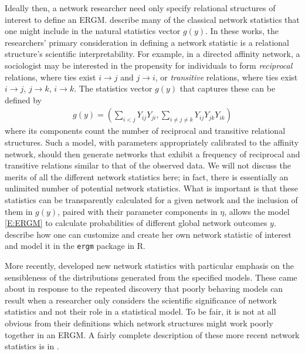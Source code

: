 Ideally then, a network researcher need only specify relational structures of 
interest to define an ERGM.  
\citet*{Wasserman:1996, Pattison:1999, logit, introp*} describe many of 
the classical network statistics that one might include in the natural statistics vector 
$g(y)$.  In these works, the researchers' primary 
consideration in defining a network statistic is a relational structure's 
scientific interpretability.  
For example, in a directed affinity network, a sociologist may be 
interested in the propensity for individuals to form \emph{reciprocal} relations, where 
ties exist $i \to j$ and $j \to i$, or \emph{transitive} relations, where 
ties exist $i \to j$, $j \to k$, $i \to k$.  The statistics vector $g(y)$ 
that captures these can be defined by
\begin{align*}
	g(y) = \left ( \sum_{i<j} Y_{ij}Y_{ji}, \sum_{i \neq j \neq k} Y_{ij}Y_{jk}Y_{ik} 
			\right )  
\end{align*}
where its components count the number of reciprocal and transitive relational 
structures.  
Such a model, with parameters appropriately calibrated to the affinity network, 
should then generate networks that exhibit a frequency of reciprocal and 
transitive relations similar to that of the observed data.
We will not discuss the merits of all the different network statistics 
here; in fact, there is essentially an unlimited number of potential network statistics.
What is important is that these statistics can be transparently calculated for a 
given network and the inclusion of them in $g(y)$, paired with their parameter 
components in $\eta$, allows the model \eqref{E:ERGM} to calculate probabilities of 
different global network outcomes $y$.  \citet*{ergm:userterms} describe how one can
customize and create her own network statistic of interest and model it in the 
\texttt{ergm} package in R.

More recently, \citet*{Handcock:2006, Hunter:2006, recentp*} developed
new network statistics with particular emphasis on the sensibleness of 
the distributions generated from the specified models.  
These came about in response to the repeated discovery that poorly behaving models can
result when a researcher only considers the scientific significance of network
statistics and not their role in a statistical model.  To be fair, it is not 
at all obvious from their definitions which network structures might work poorly
together in an ERGM.  A fairly complete description of these more recent network 
statistics is in \citet*{Morris:2008}.  

